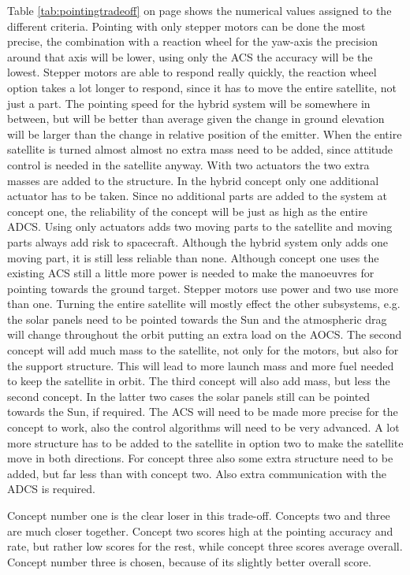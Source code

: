 Table \ref{tab:pointingtradeoff} on page \pageref{tab:pointingtradeoff} shows the numerical values assigned to the different criteria. 
Pointing with only stepper motors can be done the most precise, the combination with a reaction wheel for the yaw-axis the precision around that axis will be lower, using only the \ac{ACS} the accuracy will be the lowest. 
Stepper motors are able to respond really quickly, the reaction wheel option takes a lot longer to respond, since it has to move the entire satellite, not just a part. The pointing speed for the hybrid system will be somewhere in between, but will be better than average given the change in ground elevation will be larger than the change in relative position of the emitter.
When the entire satellite is turned almost almost no extra mass need to be added, since attitude control is needed in the satellite anyway. With two actuators the two extra masses are added to the structure. In the hybrid concept only one additional actuator has to be taken.
Since no additional parts are added to the system at concept one, the reliability of the concept will be just as high as the entire \ac{ADCS}. Using only actuators adds two moving parts to the satellite and moving parts always add risk to spacecraft. Although the hybrid system only adds one moving part, it is still less reliable than none.
Although concept one uses the existing \ac{ACS} still a little more power is needed to make the manoeuvres for pointing towards the ground target. Stepper motors use power and two use more than one.
Turning the entire satellite will mostly effect the other subsystems, e.g. the solar panels need to be pointed towards the Sun and the atmospheric drag will change throughout the orbit putting an extra load on the \ac{AOCS}. The second concept will add much mass to the satellite, not only for the motors, but also for the support structure. This will lead to more launch mass and more fuel needed to keep the satellite in orbit. The third concept will also add mass, but less the second concept. In the latter two cases the solar panels still can be pointed towards the Sun, if required.
The \ac{ACS} will need to be made more precise for the concept to work, also the control algorithms will need to be very advanced. A lot more structure has to be added to the satellite in option two to make the satellite move in both directions. For concept three also some extra structure need to be added, but far less than with concept two. Also extra communication with the \ac{ADCS} is required.

Concept number one is the clear loser in this trade-off. Concepts two and three are much closer together. Concept two scores high at the pointing accuracy and rate, but rather low scores for the rest, while concept three scores average overall. 
Concept number three is chosen, because of its slightly better overall score.